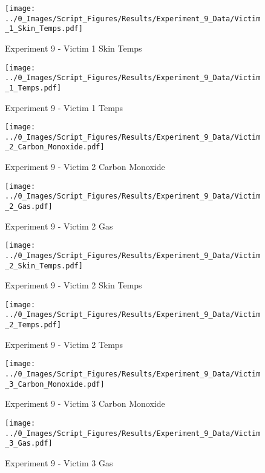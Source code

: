 	\clearpage

	\begin{figure}[H]
		\centering
		\texttt{[image: ../0\_Images/Script\_Figures/Results/Experiment\_9\_Data/Victim\_1\_Skin\_Temps.pdf]}
		\caption[]{Experiment 9 - Victim 1 Skin Temps}
	\end{figure}
 

	\begin{figure}[H]
		\centering
		\texttt{[image: ../0\_Images/Script\_Figures/Results/Experiment\_9\_Data/Victim\_1\_Temps.pdf]}
		\caption[]{Experiment 9 - Victim 1 Temps}
	\end{figure}
 
	\clearpage

	\begin{figure}[H]
		\centering
		\texttt{[image: ../0\_Images/Script\_Figures/Results/Experiment\_9\_Data/Victim\_2\_Carbon\_Monoxide.pdf]}
		\caption[]{Experiment 9 - Victim 2 Carbon Monoxide}
	\end{figure}
 

	\begin{figure}[H]
		\centering
		\texttt{[image: ../0\_Images/Script\_Figures/Results/Experiment\_9\_Data/Victim\_2\_Gas.pdf]}
		\caption[]{Experiment 9 - Victim 2 Gas}
	\end{figure}
 
	\clearpage

	\begin{figure}[H]
		\centering
		\texttt{[image: ../0\_Images/Script\_Figures/Results/Experiment\_9\_Data/Victim\_2\_Skin\_Temps.pdf]}
		\caption[]{Experiment 9 - Victim 2 Skin Temps}
	\end{figure}
 

	\begin{figure}[H]
		\centering
		\texttt{[image: ../0\_Images/Script\_Figures/Results/Experiment\_9\_Data/Victim\_2\_Temps.pdf]}
		\caption[]{Experiment 9 - Victim 2 Temps}
	\end{figure}
 
	\clearpage

	\begin{figure}[H]
		\centering
		\texttt{[image: ../0\_Images/Script\_Figures/Results/Experiment\_9\_Data/Victim\_3\_Carbon\_Monoxide.pdf]}
		\caption[]{Experiment 9 - Victim 3 Carbon Monoxide}
	\end{figure}
 

	\begin{figure}[H]
		\centering
		\texttt{[image: ../0\_Images/Script\_Figures/Results/Experiment\_9\_Data/Victim\_3\_Gas.pdf]}
		\caption[]{Experiment 9 - Victim 3 Gas}
	\end{figure}
 
